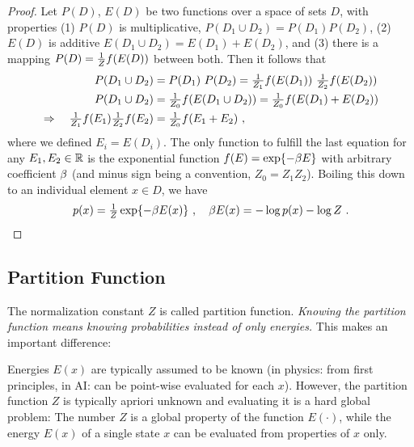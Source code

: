 {\small

\begin{proof}
Let $P(D)$, $E(D)$ be two functions over a space of sets $D$, with 
properties (1) $P(D)$ is multiplicative, $P(D_1 \cup D_2) = P(D_1)
P(D_2)$, (2) $E(D)$ is additive $E(D_1\cup D_2) = E(D_1) + E(D_2)$,
and (3) there is a mapping $P(D) = \textstyle\frac 1Z f(E(D))$ between both. Then it follows that
\begin{align}
P(D_1\cup D_2)
&= P(D_1)~ P(D_2) = \textstyle\frac 1{Z_1} f(E(D_1))~ \textstyle\frac 1{Z_2} f(E(D_2)) \\
P(D_1\cup D_2)
&= \textstyle\frac 1{Z_0} f(E(D_1\cup D_2)) = \textstyle\frac 1{Z_0} f(E(D_1) + E(D_2)) \\
\Rightarrow\quad \textstyle\frac 1{Z_1} f(E_1) \textstyle\frac 1{Z_2} f(E_2)
&= \textstyle\frac 1{Z_0} f(E_1+E_2) ~, \label{exp}
\end{align}
where we defined $E_i=E(D_i)$. The only function to fulfill
the last equation for any $E_1,E_2\in{\mathbb{R}}$ is the exponential function $f(E) = \exp\lbrace -\beta E \rbrace$ with arbitrary
 coefficient $\beta$ (and minus sign being a convention, $Z_0 = Z_1
 Z_2$). Boiling this down to an individual element $x\in D$, we have
\begin{align}
p(x) = \textstyle\frac 1Z \exp\lbrace-\beta E(x)\rbrace ~,\quad \beta E(x) = -\log p(x) - \log Z ~.
\end{align}
\end{proof}

}


\subsection{Partition Function}

The normalization constant $Z$ is called partition function. 
\emph{Knowing the partition function means knowing probabilities instead of only energies.} This makes an important difference:

Energies $E(x)$ are typically assumed to be known (in physics: from
first principles, in AI: can be point-wise evaluated for each
$x$). However, the partition function $Z$ is typically apriori unknown
and evaluating it is a hard global problem: The number $Z$ is a global
property of the function $E(\cdot)$, while the energy $E(x)$ of a
single state $x$ can be evaluated from properties of $x$
only.

